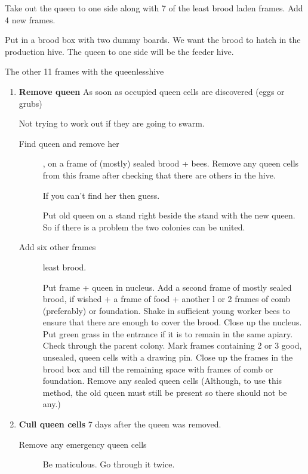 Take out the queen to one side along with 7 of the least brood laden frames.  
Add 4 new frames.


Put in a brood box with two dummy boards.
We want the brood to hatch in the production hive.
The queen to one side will be the feeder hive.

The other 11 frames with the queenlesshive

\begin{enumerate}

\item \textbf{Remove queen}
As soon as occupied queen cells are discovered (eggs or grubs)

Not trying to work out if they are going to swarm.

\begin{description}
  \item[Find queen and remove her], on a frame of (mostly) sealed brood + bees. Remove any queen cells from this frame after checking that there are others in the hive.

If you can't find her then guess.

Put old queen on a stand right beside the stand with the new queen.
So if there is a problem the two colonies can be united.

  \item[Add six other frames] least brood.
  
Put frame + queen in nucleus.
Add a second frame of mostly sealed brood, if wished + a frame of food + another l or 2
frames of comb (preferably) or foundation.
Shake in sufficient young worker bees to ensure that there are enough to cover the brood.
Close up the nucleus. Put green grass in the entrance if it is to remain in the same apiary.
Check through the parent colony.  Mark frames containing 2 or 3 good, unsealed, queen cells with a drawing pin.
Close up the frames in the brood box and till the remaining space with frames of comb or foundation.
Remove any sealed queen cells (Although, to use this method, the old queen must still be present so there should not be any.)
 \end{description}
 
 
\item \textbf{Cull queen cells}
7 days after the queen was removed.

\begin{description}
  \item[Remove any emergency queen cells] Be maticulous.  Go through it twice.
  

\end{description}
\end{enumerate}
